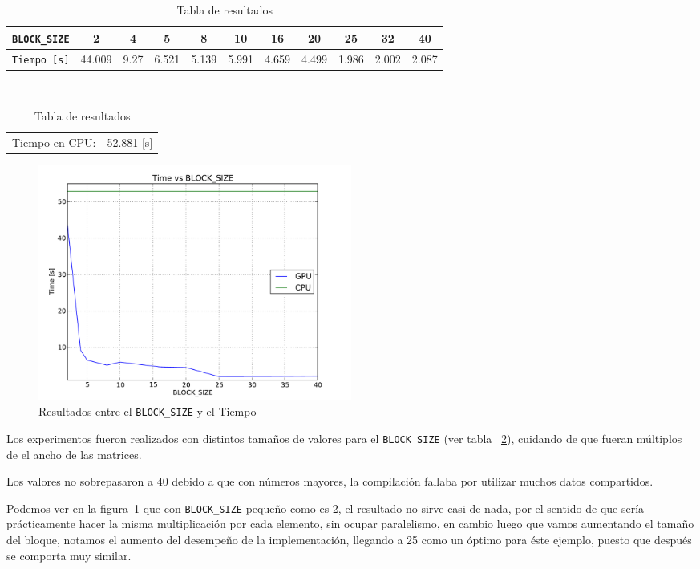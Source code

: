 \begin{table}[!ht]
\begin{center}
	\begin{tabular}{|l|c|c|c|c|c|c|c|c|c|c|}
		\hline
		\texttt{BLOCK\_SIZE} & 2 & 4 & 5 & 8 & 10 & 16 & 20 & 25 & 32 & 40 \\\hline
		\texttt{Tiempo [s]}  & 44.009 & 9.27 & 6.521 & 5.139 & 5.991 & 4.659 & 4.499 & 1.986 & 2.002 & 2.087 \\\hline
	\end{tabular}
	\\
	\begin{tabular}{cc}
		Tiempo en CPU: & 52.881 [s] \\
	\end{tabular}
\end{center}
\caption{Tabla de resultados}
\label{table:1}
\end{table}

\begin{figure}[!ht]
\begin{center}
	\includegraphics[width=0.5\textwidth]{img/plot-proyecto.pdf}
\end{center}
\caption{Resultados entre el \texttt{BLOCK\_SIZE} y el Tiempo}
\label{fig:1}
\end{figure}

Los experimentos fueron realizados con distintos tamaños de
valores para el \texttt{BLOCK\_SIZE} (ver tabla ~\ref{table:1}), cuidando de que fueran
múltiplos de el ancho de las matrices.

Los valores no sobrepasaron a $40$ debido a que con números
mayores, la compilación fallaba por utilizar muchos datos compartidos.

Podemos ver en la figura~\ref{fig:1} que con \texttt{BLOCK\_SIZE} pequeño como es 2,
el resultado no sirve casi de nada, por el sentido de que sería prácticamente hacer
la misma multiplicación por cada elemento, sin ocupar paralelismo,
en cambio luego que vamos aumentando el tamaño del bloque,
notamos el aumento del desempeño de la implementación, llegando
a 25 como un óptimo para éste ejemplo, puesto que después se comporta
muy similar.

